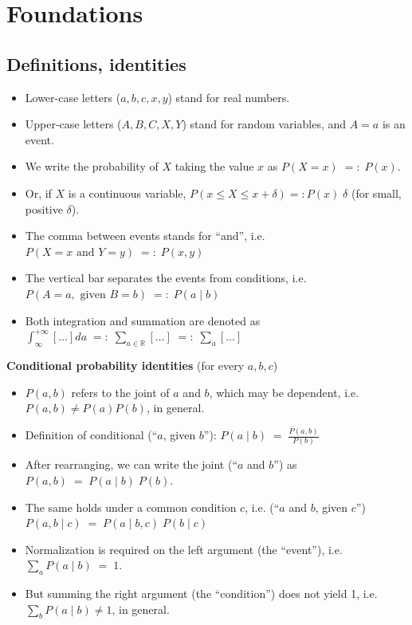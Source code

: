 \section{Foundations}

\subsection{Definitions, identities}
\begin{itemize}
	\item Lower-case letters ($a, b, c, x, y$) stand for real numbers.
	\item Upper-case letters ($A, B, C, X, Y$) stand for random variables, and $A = a$ is an event.
	\item We write the probability of $X$ taking the value $x$ as $P(X = x) \;=:\; P(x)$.
	\item Or, if $X$ is a continuous variable, $P(x \leq X \leq x + \delta) =: P(x)\;\delta$ (for small, positive $\delta$).
	\item The comma between events stands for ``and'', i.e. $P(X = x \text{ and } Y = y) \;=:\; P(x, y)$
	\item The vertical bar separates the events from conditions, i.e. $P(A = a, \text{ given } B = b) \;=:\; P(a\;|\;b)$
	\item Both integration and summation are denoted as $\int_{\infty}^{+\infty}[\ldots] da \;=:\; \sum_{a\in \mathds{R}} [\ldots] \;=:\; \sum_a[\ldots] $
\end{itemize}
{\bf Conditional probability identities} (for every $a, b, c$)
\begin{itemize}
	\item $P(a,b)$ refers to the joint of $a$ and $b$, which may be dependent, i.e. $P(a,b) \neq P(a)P(b)$, in general.
	\item Definition of conditional (``$a$, given $b$''): $P(a\;|\;b) \;=\; \frac{P(a,b)}{P(b)}$
	\item After rearranging, we can write the joint (``$a$ and $b$'') as $P(a, b) \;=\; P(a\;|\; b) \;P(b)$.
	\item The same holds under a common condition $c$, i.e. (``$a$ and $b$, given $c$'') $P(a, b\;|\;c) \;=\;  P(a\;|\;b,c) \; P(b\;|\;c)$
	\item Normalization is required on the left argument (the ``event''), i.e. $\sum_a P(a\;|\;b) \;=\; 1$.
	\item But summing the right argument (the ``condition'') does not yield 1, i.e.  \;$\sum_b P(a\;|\;b) \neq 1$, in general.
\end{itemize}
